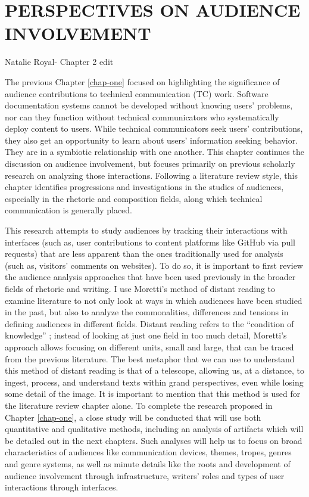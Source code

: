 \chapter{PERSPECTIVES ON AUDIENCE INVOLVEMENT}
\label{chap-two}

Natalie Royal- Chapter 2 edit

The previous Chapter \ref{chap-one} focused on highlighting the significance of audience contributions to technical communication (TC) work. Software documentation systems cannot be developed without knowing users’ problems, nor can they function without technical communicators who systematically deploy content to users. While technical communicators seek users’ contributions, they also get an opportunity to learn about users’ information seeking behavior. They are in a symbiotic relationship with one another. This chapter continues the discussion on audience involvement, but focuses primarily on previous scholarly research on analyzing those interactions. Following a literature review style, this chapter identifies progressions and investigations in the studies of audiences, especially in the rhetoric and composition fields, along which technical communication is generally placed.

This research attempts to study audiences by tracking their interactions with interfaces (such as, user contributions to content platforms like GitHub via pull requests) that are less apparent than the ones traditionally used for analysis (such as, visitors’ comments on websites). To do so, it is important to first review the audience analysis approaches that have been used previously in the broader fields of rhetoric and writing. I use Moretti’s \cite{moretti2000conjectures} method of distant reading to examine literature to not only look at ways in which audiences have been studied in the past, but also to analyze the commonalities, differences and tensions in defining audiences in different fields. Distant reading refers to the “condition of knowledge” \cite{moretti2000conjectures}; instead of looking at just one field in too much detail, Moretti’s approach allows focusing on different units, small and large, that can be traced from the previous literature. The  best  metaphor  that  we  can  use  to understand this method of distant reading is that of a telescope, allowing us, at a distance, to ingest, process, and understand texts within grand perspectives, even while losing some detail of the image. It is important to mention that this method is used for the literature review chapter alone. To complete the research proposed in Chapter \ref{chap-one}, a close study will be conducted that will use both quantitative and qualitative methods, including an analysis of artifacts which will be detailed out in the next chapters. Such analyses will help us to focus on broad characteristics of audiences like communication devices, themes, tropes, genres and genre systems, as well as minute details like the roots and development of audience involvement through infrastructure, writers’ roles and types of user interactions through interfaces.

